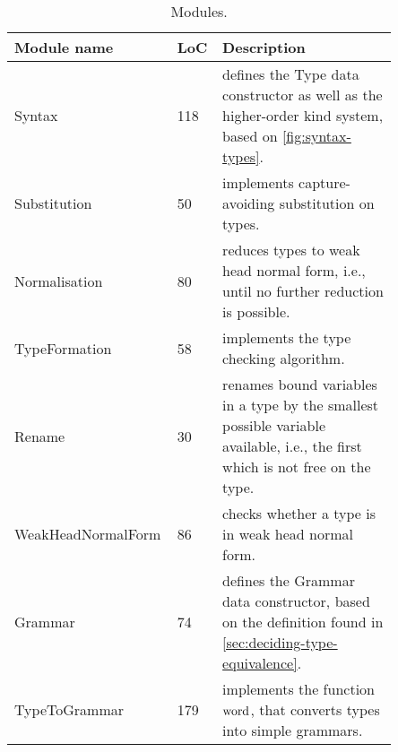 \renewcommand{\arraystretch}{1.0}
\begin{table}[h!]
    \centering
    \begin{tabular}{| @{\hskip 0.1in}p{0.3\linewidth}@{\hskip 0.1in} | @{\hskip 0.1in}p{0.10\linewidth}@{\hskip 0.1in} | @{\hskip 0.1in}p{0.45\linewidth}|}
        \hline
        \textbf{Module name} & \textbf{LoC} & \textbf{Description}\\
        \hline
        Syntax & 118 & defines the Type data constructor as well as the higher-order kind system, based on \cref*{fig:syntax-types}.\\
        \hline
        Substitution & 50 & implements capture-avoiding substitution on types.\\
        \hline
        Normalisation & 80 & reduces types to weak head normal form, i.e., until no further reduction is possible.\\
        \hline
        TypeFormation & 58 & implements the type checking algorithm.\\
        \hline
        Rename & 30 & renames bound variables in a type by the smallest possible variable available, i.e., the first which is not free on the type.\\
        \hline
        WeakHeadNormalForm & 86 & checks whether a type is in weak head normal form.\\
        \hline
        Grammar & 74 & defines the Grammar data constructor, based on the definition found in \cref*{sec:deciding-type-equivalence}.\\
        \hline
        TypeToGrammar & 179 & implements the function $\operatorname{word}$, that converts types into simple grammars.\\
        \hline
    \end{tabular}
    \caption{Modules.}
    \label{tab:modules}
\end{table}